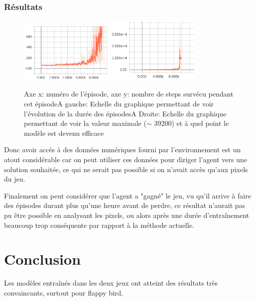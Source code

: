 \documentclass[a4paper,10pt,openany,oneside]{report}
\begin{document}
\subsection{Résultats}
\begin{figure}[H]
	\centering
	\includegraphics[width=0.4\textwidth]{img/flappybird_fit.png}
	\includegraphics[width=0.4\textwidth]{img/flappybird_dezoom.png}
	\caption{Axe x: numéro de l'épisode, axe y: nombre de steps survécu pendant cet épisode\hspace{\textwidth}A gauche: Echelle du graphique permettant de voir l'évolution de la durée des épisodes\hspace{\textwidth}A Droite: Echelle du graphique permettant de voir la valeur maximale ($\sim$ 39200) et à quel point le modèle est devenu efficace}
\end{figure}

Donc avoir accès à des données numériques fourni par l'environnement est un atout considérable car on peut utiliser ces données pour diriger l'agent vers une solution souhaitée, ce qui ne serait pas possible si on n'avait accès qu'aux pixels du jeu.

Finalement on peut considérer que l'agent a "gagné" le jeu, vu qu'il arrive à faire des épisodes durant plus qu'une heure avant de perdre, ce résultat n'aurait pas pu être possible en analysant les pixels, ou alors après une durée d'entraînement beaucoup trop conséquente par rapport à la méthode actuelle.

\chapter{Conclusion}
\thispagestyle{headings}
Les modèles entraînés dans les deux jeux ont atteint des résultats très convaincants, surtout pour flappy bird.
\end{document}
